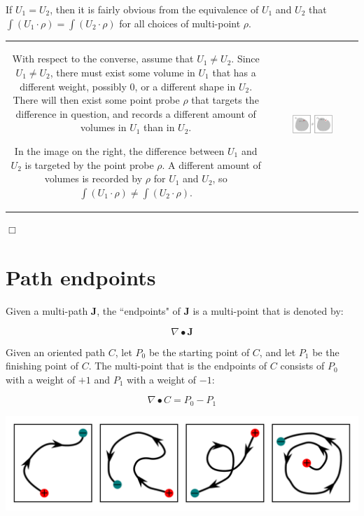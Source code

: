 \documentclass{book}
\begin{document}
If \(U_1 = U_2\), then it is fairly obvious from the equivalence of \(U_1\) and \(U_2\) that \(\int (U_1 \cdot \rho) = \int (U_2 \cdot \rho)\) for all choices of multi-point \(\rho\). 

\vspace{5mm}

\begin{tabular}{cc}
\parbox{0.5\textwidth}{
With respect to the converse, assume that \(U_1 \neq U_2\). Since \(U_1 \neq U_2\), there must exist some volume in \(U_1\) that has a different weight, possibly \(0\), or a different shape in \(U_2\). There will then exist some point probe \(\rho\) that targets the difference in question, and records a different amount of volumes in \(U_1\) than in \(U_2\).

In the image on the right, the difference between \(U_1\) and \(U_2\) is targeted by the point probe \(\rho\). A different amount of volumes is recorded by \(\rho\) for \(U_1\) and \(U_2\), so \(\int (U_1 \cdot \rho) \neq \int (U_2 \cdot \rho)\).
} & \parbox{0.5\textwidth}{
\includegraphics[width = 0.5\textwidth]{Point_totals/scanning_volumes_using_points}
}
\end{tabular}

\(\Box\)





\section{Path endpoints}

Given a multi-path \(\mathbf{J}\), the ``endpoints" of \(\mathbf{J}\) is a multi-point that is denoted by:

\[\nabla \bullet \mathbf{J}\]

Given an oriented path \(C\), let \(P_0\) be the starting point of \(C\), and let \(P_1\) be the finishing point of \(C\). The multi-point that is the endpoints of \(C\) consists of \(P_0\) with a weight of \(+1\) and \(P_1\) with a weight of \(-1\):

\[\nabla \bullet C = P_0 - P_1\]

\begin{center}
\includegraphics[width = \textwidth]{Boundaries/Path_endpoints/path_endpoint_examples}
\end{center}
\end{document}
